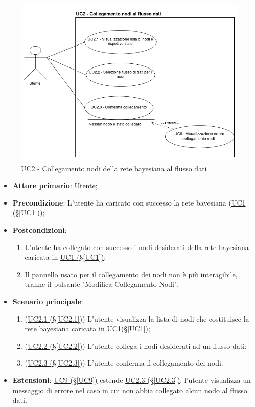 \begin{figure}[H]
\centering
\includegraphics[scale=0.5]{./images/UC2.png}
\caption{UC2 - Collegamento nodi della rete bayesiana al flusso dati}
\end{figure}

\begin{itemize}
\item \textbf{Attore primario}: Utente;
\item \textbf{Precondizione}: L'utente ha caricato con successo la rete bayesiana (\hyperref[UC1]{UC1 (§\ref*{UC1})});
\item \textbf{Postcondizioni}: 
	\begin{enumerate}
	\item L'utente ha collegato con successo i nodi desiderati della rete bayesiana caricata in \hyperref[UC1]{UC1 				(§\ref*{UC1})};
	\item Il pannello usato per il collegamento dei nodi non è più interagibile, tranne il pulsante "Modifica 							Collegamento Nodi".
	\end{enumerate}
\item \textbf{Scenario principale}:
	\begin{enumerate}
	\item (\hyperref[UC2.1]{UC2.1 (§\ref*{UC2.1})}) L'utente visualizza la lista di nodi che costituisce la rete bayesiana caricata in \hyperref[UC1]{UC1(§\ref*{UC1})};
	\item (\hyperref[UC2.2]{UC2.2 (§\ref*{UC2.2})}) L'utente collega i nodi desiderati ad un flusso dati;
	\item (\hyperref[UC2.3]{UC2.3 (§\ref*{UC2.3})}) L'utente conferma il collegamento dei nodi.
	\end{enumerate}
\item \textbf{Estensioni}: \hyperref[UC9]{UC9 (§\ref*{UC9})} estende \hyperref[UC2.3]{UC2.3 (§\ref*{UC2.3})}: l'utente visualizza un messaggio di errore nel caso in cui non abbia collegato alcun nodo al flusso dati.
\end{itemize}

